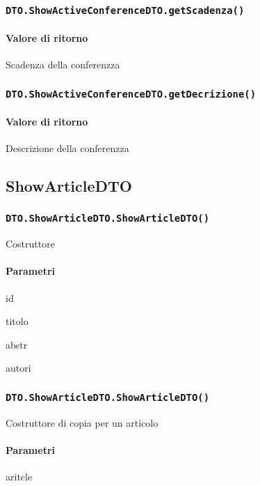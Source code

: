 \subsubsection{\texttt{DTO.ShowActiveConferenceDTO.getScadenza()}}
\paragraph{Valore di ritorno}
\begin{description}
\item Scadenza  della conferenzza
\end{description}
\subsubsection{\texttt{DTO.ShowActiveConferenceDTO.getDecrizione()}}
\paragraph{Valore di ritorno}
\begin{description}
\item Descrizione della conferenzza
\end{description}

\subsection{ShowArticleDTO}
\subsubsection{\texttt{DTO.ShowArticleDTO.ShowArticleDTO()}}
Costruttore
\paragraph{Parametri}
\begin{description}
\item id
\item titolo
\item abstr
\item autori
\end{description}
\subsubsection{\texttt{DTO.ShowArticleDTO.ShowArticleDTO()}}
Costruttore di copia per un articolo
\paragraph{Parametri}
\begin{description}
\item aritcle
\end{description}
